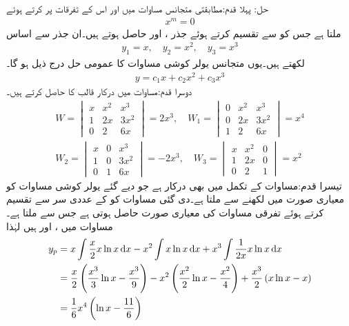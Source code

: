 حل: پہلا قدم:\quad مطابقتی متجانس مساوات میں  اور اس کے تفرقات  پر کرتے ہوئے
\begin{align*}
[m(m-1)(m-1)-3m(m-1)+6m-6]x^m=0
\end{align*}
ملتا ہے جس کو  سے تقسیم کرتے ہوئے  جذر ،  اور  حاصل ہوتے ہیں۔ان جذر سے اساس
\begin{align*}
y_1=x, \quad y_2=x^2,\quad y_3=x^3
\end{align*}
لکھتے ہیں۔یوں متجانس یولر کوشی مساوات کا عمومی حل درج ذیل ہو گا۔
\begin{align*}
y=c_1x+c_2x^2+c_3x^3
\end{align*}
دوسرا قدم:\quad مساوات  میں درکار قالب کا  حاصل کرتے ہیں۔
\begin{align*}
W=
\begin{vmatrix}
x & x^2 & x^3\\
1 & 2x & 3x^2\\
0 & 2 &  6x
\end{vmatrix}=2x^3, \quad
W_1=
\begin{vmatrix}
0 & x^2 & x^3\\
0 & 2x & 3x^2\\
1 & 2 &  6x
\end{vmatrix}=x^4\\
W_2=
\begin{vmatrix}
x & 0 & x^3\\
1 & 0 & 3x^2\\
0 & 1 &  6x
\end{vmatrix}=-2x^3, \quad
W_3=
\begin{vmatrix}
x & x^2 &0\\
1 & 2x & 0\\
0 & 2 &  1
\end{vmatrix}=x^2
\end{align*}
تیسرا قدم:\quad مساوات  کے تکمل میں  بھی درکار ہے جو دیے گئے یولر کوشی مساوات کو معیاری صورت میں لکھنے سے ملتا ہے۔دی گئی مساوات کو  کے عددی سر   سے تقسیم کرتے ہوئے تفرقی مساوات کی معیاری صورت حاصل ہوتی ہے جس سے  ملتا ہے۔مساوات   میں ،  اور
  ہیں لہٰذا 
\begin{align*}
y_p&=x\int \frac{x}{2} x\ln x \dif x-x^2\int x\ln x \dif x+x^3\int \frac{1}{2x} x\ln x \dif x\\
&=\frac{x}{2}\left(\frac{x^3}{3}\ln x -\frac{x^3}{9}\right)-x^2\left(\frac{x^2}{2}\ln x-\frac{x^2}{4}\right)+\frac{x^3}{2}\left(x\ln x-x\right)\\
&=\frac{1}{6}x^4\left(\ln x-\frac{11}{6}\right)
\end{align*}
